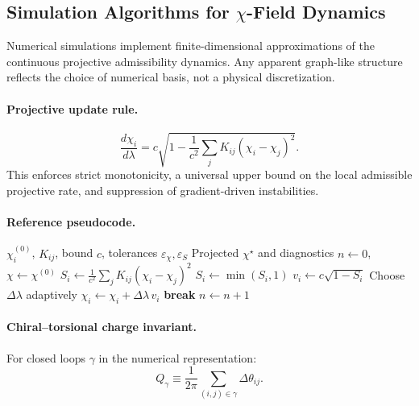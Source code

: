 \subsection{Simulation Algorithms for \texorpdfstring{$\chi$}{χ}-Field Dynamics}
  \label{subsec:simulation-algorithms}

  Numerical simulations implement finite-dimensional approximations of
  the continuous projective admissibility dynamics.
  Any apparent graph-like structure reflects the choice of numerical
  basis, not a physical discretization.

  \paragraph{Projective update rule.}
    \begin{equation}
      \frac{d\chi_i}{d\lambda}
      = c \sqrt{
        1 - \frac{1}{c^2}
        \sum_j K_{ij}(\chi_i - \chi_j)^2
      }.
      \label{eq:discrete-dynamics}
    \end{equation}
    This enforces strict monotonicity, a universal upper bound on the local
    admissible projective rate, and suppression of gradient-driven
    instabilities.

  \paragraph{Reference pseudocode.}
    \begin{algorithm}[t]
\caption{Bounded $\chi$-projection with diagnostics}
\label{alg:bounded-chi-relaxation}
\begin{algorithmic}[1]
  \Require $\chi^{(0)}_i$, $K_{ij}$, bound $c$,
  tolerances $\varepsilon_\chi,\varepsilon_S$
  \Ensure Projected $\chi^\star$ and diagnostics
  \State $n \gets 0$, $\chi \gets \chi^{(0)}$
      \State $S_i \gets
      \frac{1}{c^2}\sum_j K_{ij}(\chi_i-\chi_j)^2$
      \State $S_i \gets \min(S_i,1)$
      \State $v_i \gets c\sqrt{1 - S_i}$
    \EndFor
    \State Choose $\Delta\lambda$ adaptively
    \State $\chi_i \gets \chi_i + \Delta\lambda\,v_i$
      \textbf{break}
    \EndIf
    \State $n \gets n+1$
  \EndWhile
\end{algorithmic}
    \end{algorithm}

  \paragraph{Chiral--torsional charge invariant.}
    For closed loops $\gamma$ in the numerical representation:
    \begin{equation}
      Q_\gamma
      \equiv
      \frac{1}{2\pi}
      \sum_{(i,j)\in\gamma} \Delta\theta_{ij}.
      \label{eq:charge_winding_pseudocode}
    \end{equation}

